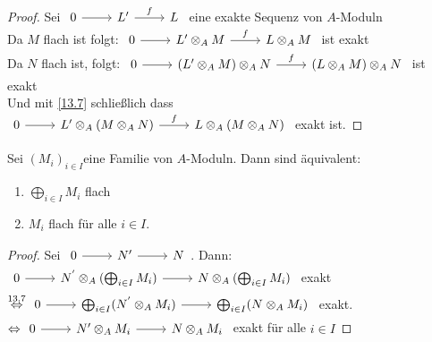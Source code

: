 \begin{proof}
	Sei $\begin{tikzcd}
	0 \arrow{r} & L' \arrow{r}{f} & L \end{tikzcd}$ eine exakte Sequenz von $A$-Moduln \\
	Da $M$ flach ist folgt: $\begin{tikzcd}	0 \arrow{r} & L' \otimes_A M \arrow{r}{f} & L \otimes_A M \end{tikzcd}$ ist exakt \\
	Da $N$ flach ist, folgt: 
	$\begin{tikzcd}	0 \arrow{r} & (L' \otimes_A M) \otimes_A N\arrow{r}{f} & (L \otimes_A M) \otimes_A N \end{tikzcd}$ ist exakt \\
	Und mit \ref{13.7} schließlich dass
	$\begin{tikzcd}	0 \arrow{r} & L' \otimes_A (M \otimes_A N) \arrow{r}{f} & L \otimes_A( M \otimes_A N) \end{tikzcd}$ exakt ist.
	
\end{proof}
\begin{bem} \label{13.20}
	Sei $(M_i)_{i \in I } $eine Familie von $A$-Moduln. Dann sind äquivalent: 
	\begin{enumerate} [label= \roman*)]
		\item $\bigoplus_{i \in I} M_i $ flach
		\item $M_i $ flach für alle $i \in I$.
	\end{enumerate}
\end{bem}
\begin{proof}
	Sei $\begin{tikzcd} 0 \arrow{r} & N' \arrow{r} & N \end{tikzcd}$. Dann: \\
	$\begin{tikzcd}
	0 \arrow{r} & N^{'}\otimes_A (\bigoplus_{i \in I} M_i) \arrow{r} & N \otimes_A (\bigoplus_{i \in I} M_i) \end{tikzcd}$ exakt \\
	$\overset{13.7}{\Lra} \begin{tikzcd}
	0 \arrow{r} & \bigoplus_{i \in I} (N^{'}\otimes_A M_i) \arrow{r} & \bigoplus_{i \in I} (N^{}\otimes_A M_i) \end{tikzcd}$ exakt.\\
	 $\Lra \begin{tikzcd} 0 \arrow{r} & N' \otimes_A M_i \arrow{r} & N \otimes_A M_i \end{tikzcd}$ exakt für alle $i \in I$
\end{proof}
